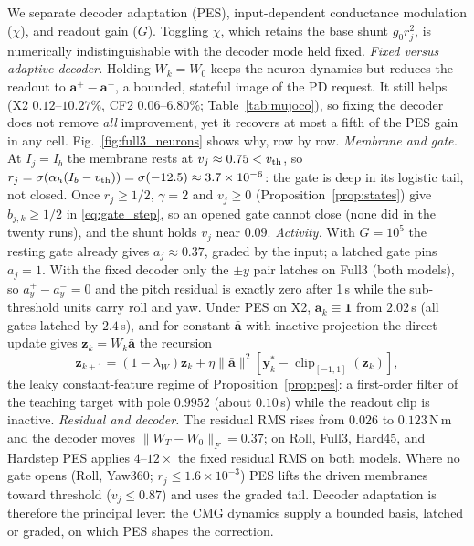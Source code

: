 \documentclass[letterpaper, 10 pt, conference]{ieeeconf}
\newcommand{\clip}{\operatorname{clip}}
\begin{document}
We separate decoder adaptation (PES), input-dependent conductance
modulation ($\chi$), and readout gain ($G$). Toggling $\chi$, which
retains the base shunt $g_0r_j^2$, is numerically indistinguishable with
the decoder mode held fixed. \emph{Fixed versus adaptive decoder.} Holding $W_k=W_0$ keeps the neuron
dynamics but reduces the readout to $\bm a^+-\bm a^-$, a bounded, stateful
image of the PD request. It still helps (X2 $0.12$--$10.27\%$, CF2
$0.06$--$6.80\%$; Table~\ref{tab:mujoco}), so fixing the decoder does not
remove \emph{all} improvement, yet it recovers at most a fifth of the PES
gain in any cell. Fig.~\ref{fig:full3_neurons} shows why, row by row.
\emph{Membrane and gate.} At $I_j=I_b$ the membrane rests at
$v_j\approx0.75<v_{\rm th}$, so
$r_j=\sigma(\alpha_h(I_b-v_{\rm th}))=\sigma(-12.5)\approx3.7\times10^{-6}$:
the gate is deep in its logistic tail, not closed. Once $r_j\ge1/2$,
$\gamma=2$ and $v_j\ge0$ (Proposition~\ref{prop:states}) give
$b_{j,k}\ge1/2$ in \eqref{eq:gate_step}, so an opened gate cannot close
(none did in the twenty runs), and the shunt holds $v_j$ near $0.09$.
\emph{Activity.} With $G=10^5$ the resting gate already gives
$a_j\approx0.37$, graded by the input; a latched gate pins $a_j=1$. With
the fixed decoder only the $\pm y$ pair latches on Full3 (both models), so
$a^+_y-a^-_y=0$ and the pitch residual is exactly zero after 1\,s while
the sub-threshold units carry roll and yaw. Under PES on X2,
$\bm a_k\equiv\bm1$ from $2.02$\,s (all gates latched by $2.4$\,s), and
for constant $\bar{\bm a}$ with inactive projection the direct update
gives $\bm z_k=W_k\bar{\bm a}$ the recursion
\begin{equation}
 \bm z_{k+1}=(1-\lambda_W)\bm z_k
 +\eta\|\bar{\bm a}\|^2[\bm y_k^*-\clip_{[-1,1]}(\bm z_k)],
 \label{eq:constantbasis}
\end{equation}
the leaky constant-feature regime of Proposition~\ref{prop:pes}: a
first-order filter of the teaching target with pole $0.9952$ (about
$0.10$\,s) while the readout clip is inactive.
\emph{Residual and decoder.} The residual RMS rises from $0.026$ to
$0.123$\,N\,m and the decoder moves $\|W_T-W_0\|_F=0.37$; on Roll, Full3,
Hard45, and Hardstep PES applies $4$--$12\times$ the fixed residual RMS on
both models. Where no gate opens (Roll, Yaw360; $r_j\le1.6\times10^{-3}$)
PES lifts the driven membranes toward threshold ($v_j\le0.87$) and uses
the graded tail. Decoder adaptation is therefore the principal lever: the
CMG dynamics supply a bounded basis, latched or graded, on which PES
shapes the correction.
\end{document}
